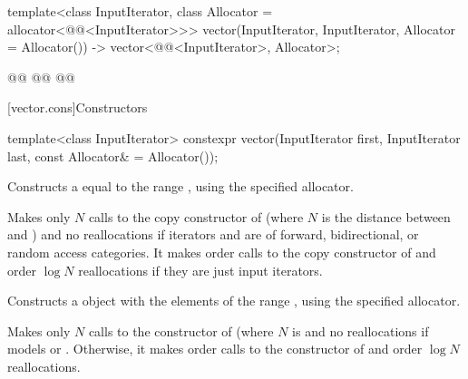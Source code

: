 \documentclass{wg21}
\begin{document}
\begin{codeblock}
{    template<class InputIterator, class Allocator = allocator<@@<InputIterator>>>
    vector(InputIterator, InputIterator, Allocator = Allocator())
    -> vector<@@<InputIterator>, Allocator>;

    @@
    @@
    @@
}
\end{codeblock}%
[vector.cons]{Constructors}


\begin{itemdecl}
    template<class InputIterator>
    constexpr vector(InputIterator first, InputIterator last,
    const Allocator& = Allocator());
\end{itemdecl}

\begin{itemdescr}

    \pnum
    \effects
    Constructs a  equal to the
    range , using the specified allocator.

    \pnum
    \complexity
    Makes only $N$
    calls to the copy constructor of
    (where $N$
    is the distance between
    and
    )
    and no reallocations if iterators  and  are of forward, bidirectional, or random access categories.
    It makes order
    calls to the copy constructor of
    and order
    $\log N$
    reallocations if they are just input iterators.
\end{itemdescr}

\begin{addedblock}
\begin{itemdecl}
template<@@ R>}
vector(from_range_t, R&& range, const Allocator& = Allocator());
\end{itemdecl}

\begin{itemdescr}
    \pnum
    \effects
    Constructs a  object with the elements of the range , using the specified allocator.

    \pnum
   \complexity
   Makes only $N$ calls to the constructor of  (where $N$ is 
   and no reallocations if  models  or .
   Otherwise, it makes order  calls to the constructor of  and order $\log N$ reallocations.
\end{itemdescr}
\end{addedblock}
\end{document}
